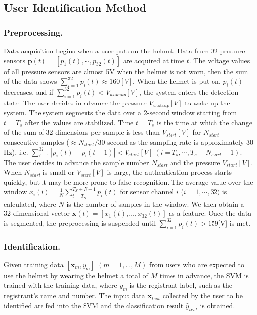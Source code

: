 \documentclass[english,preprint,JIP]{ipsj}
\begin{document}
\subsection{User Identification Method}


\subsubsection{Preprocessing.}
Data acquisition begins when a user puts on the helmet. Data from 32 pressure sensors $\bm{p}(t)=[p_1(t),\cdots,p_{32}(t)]$ are acquired at time $t$. The voltage values of all pressure sensors are almost 5V when the helmet is not worn, then the sum of the data shows $\sum_{i=1}^{32}p_i(t)\approx160[V]$. When the helmet is put on, $p_i(t)$ decreases, and if $\sum_{i=1}^{32}p_i(t)<V_{wakeup}[V]$, the system enters the detection state. The user decides in advance the pressure $V_{wakeup}[V]$ to wake up the system. The system segments the data over a 2-second window starting from $t=T_s$ after the values are stabilized. Time $t=T_s$ is the time at which the change of the sum of 32 dimensions per sample is less than $V_{start}[V]$ for $N_{start}$ consecutive samples ($\approx N_{start}/30$ second as the sampling rate is approximately 30 Hz), i.e. $\sum_{i=1}^{32}|p_i(t)-p_i(t-1)|<V_{start}[V]~(i=T_s,\cdots,T_s-N_{start}-1)$. The user decides in advance the sample number $N_{start}$ and the pressure $V_{start}[V]$. When $N_{start}$ is small or $V_{start}[V]$ is large, the authentication process starts quickly, but it may be more prone to false recognition. The average value over the window $x_i(t)=\frac{1}{N}\sum_{t=T_S}^{T_S+N-1}p_i(t)$ for sensor channel $i$ ($i=1,\cdots,32)$ is calculated, where $N$ is the number of samples in the window. We then obtain a 32-dimensional vector $\bm{x}(t)=[x_{1}(t),\dots,x_{32}(t)]$ as a feature. Once the data is segmented, the preprocessing is suspended until $\sum_{i=1}^{32}p_i(t)>159$[V] is met.


\subsubsection{Identification.}
Given training data $[\bm{x}_m,y_m]$ $(m=1,\dots, M)$ from users who are expected to use the helmet by wearing the helmet a total of $M$ times in advance, the SVM is trained with the training data, where $y_m$ is the registrant label, such as the registrant's name and number. The input data $\bm{x}_{test}$ collected by the user to be identified are fed into the SVM and the classification result $\hat{y}_{test}$ is obtained.
\end{document}
